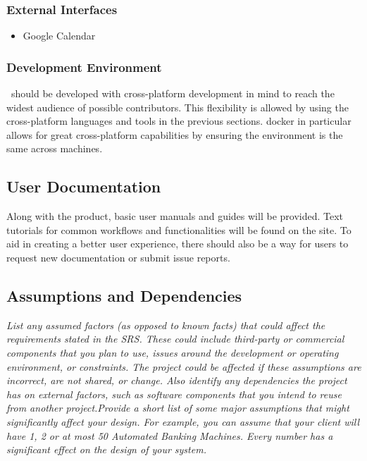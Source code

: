         \subsubsection{External Interfaces}
            \begin{itemize}
                \item Google Calendar
            \end{itemize}
        \subsubsection{Development Environment}\label{sec:development-environment}
            \projectName\ should be developed with cross-platform development in mind to reach the widest audience of possible contributors. This flexibility is allowed by using the cross-platform languages and tools in the previous sections. \Gls{docker} in particular allows for great cross-platform capabilities by ensuring the environment is the same across machines.
    \subsection{User Documentation}\label{sec:user-documentation}
        Along with the product, basic user manuals and guides will be provided. Text tutorials for common workflows and functionalities will be found on the site. To aid in creating a better user experience, there should also be a way for users to request new documentation or submit issue reports.
    \subsection{Assumptions and Dependencies}\label{sec:assumptions-dependencies}
        \emph{List any assumed factors (as opposed to known facts) that could affect the requirements stated in the SRS. These could include third-party or commercial components that you plan to use, issues around the development or operating environment, or constraints. The project could be affected if these assumptions are incorrect, are not shared, or change. Also identify any dependencies the project has on external factors, such as software components that you intend to reuse from another project.\gnl Provide a short list of some major assumptions that might significantly affect your design. For example, you can assume that your client will have 1, 2 or at most 50 Automated Banking Machines. Every number has a significant effect on the design of your system.}
